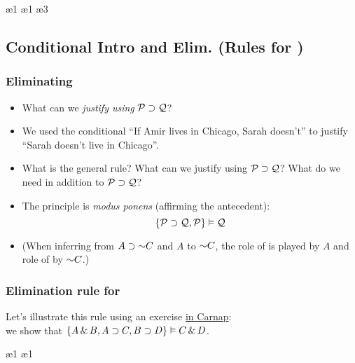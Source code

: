 \begin{frame}
  \begin{fitchproof}
     \pr{}
    \ae{1}
    \ae{1}
    \ae{3}
  \end{fitchproof}
\end{frame}

\subsection{Conditional Intro and Elim. (Rules for \eif)}

\begin{frame}
  \frametitle{Eliminating \eif}

  \begin{itemize}[<+->]
    \item What can we \emph{justify using} $\mathcal{P} \supset \mathcal{Q}$?
    \item We used the conditional ``If Amir lives in Chicago, Sarah
    doesn't'' to justify ``Sarah doesn't live in
    Chicago''.
    \item What is the general rule? What can we justify using
    $\mathcal{P} \supset \mathcal{Q}$? What do we need in addition to $\mathcal{P} \supset \mathcal{Q}$?
    \item The principle is \emph{modus ponens} (affirming the antecedent):
    \[ \{ \mathcal{P} \supset \mathcal{Q}, \mathcal{P} \} \vDash \mathcal{Q}\]
    \item (When inferring from $A \eif \enot C$ and $A$ to $\enot C$, the role
    of  is played by $A$ and role of  by $\enot C$.)
  \end{itemize}
\end{frame}

\begin{frame}
  \frametitle{Elimination rule for \eif}
  \begin{fitchproof}
     
  \end{fitchproof}

  Let's illustrate this rule using an exercise
 \href{https://tinyurl.com/2p82rpv5}{in Carnap}: \\ we
  show that $\{A \,\&\, B, A \supset C, B \supset D \} \vDash C \,\&\, D$.
\end{frame}

\begin{frame}
  \begin{fitchproof}
     \pr{}
     \pr{}
     \pr{}
    \ae{1}
    \ae{1}
  \end{fitchproof}
\end{frame}

